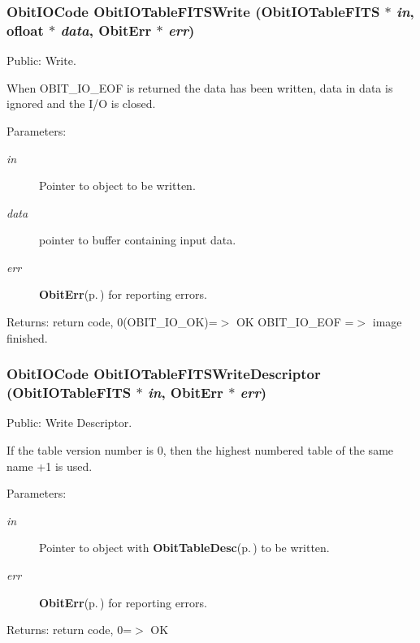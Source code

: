 \subsubsection{\setlength{\rightskip}{0pt plus 5cm}Obit\-IOCode Obit\-IOTable\-FITSWrite ({\bf Obit\-IOTable\-FITS} $\ast$ {\em in}, {\bf ofloat} $\ast$ {\em data}, {\bf Obit\-Err} $\ast$ {\em err})}\label{ObitIOTableFITS_8h_a14}


Public: Write. 

When OBIT\_\-IO\_\-EOF is returned the data has been written, data in data is ignored and the I/O is closed. \begin{Desc}
\item[Parameters:]
\begin{description}
\item[{\em in}]Pointer to object to be written. \item[{\em data}]pointer to buffer containing input data. \item[{\em err}]{\bf Obit\-Err}{\rm (p.\,\pageref{structObitErr})} for reporting errors. \end{description}
\end{Desc}
\begin{Desc}
\item[Returns:]return code, 0(OBIT\_\-IO\_\-OK)=$>$ OK OBIT\_\-IO\_\-EOF =$>$ image finished. \end{Desc}
\subsubsection{\setlength{\rightskip}{0pt plus 5cm}Obit\-IOCode Obit\-IOTable\-FITSWrite\-Descriptor ({\bf Obit\-IOTable\-FITS} $\ast$ {\em in}, {\bf Obit\-Err} $\ast$ {\em err})}\label{ObitIOTableFITS_8h_a18}


Public: Write Descriptor. 

If the table version number is 0, then the highest numbered table of the same name +1 is used. \begin{Desc}
\item[Parameters:]
\begin{description}
\item[{\em in}]Pointer to object with {\bf Obit\-Table\-Desc}{\rm (p.\,\pageref{structObitTableDesc})} to be written. \item[{\em err}]{\bf Obit\-Err}{\rm (p.\,\pageref{structObitErr})} for reporting errors. \end{description}
\end{Desc}
\begin{Desc}
\item[Returns:]return code, 0=$>$ OK \end{Desc}
